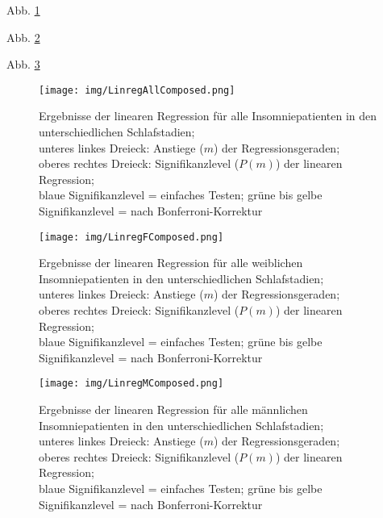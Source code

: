 Abb. \ref{fig:LinregAllComposed}

Abb. \ref{fig:LinregFComposed}

Abb. \ref{fig:LinregMComposed}




\begin{figure}[H]
	\centering
	\texttt{[image: img/LinregAllComposed.png]}
	\caption[Ergebnisse der linearen Regression für alle Insomniepatienten]{Ergebnisse der linearen Regression für alle Insomniepatienten in den unterschiedlichen Schlafstadien;\\unteres linkes Dreieck: Anstiege ($m$) der Regressionsgeraden;\\oberes rechtes Dreieck: Signifikanzlevel ($P(m)$) der linearen Regression;\\blaue Signifikanzlevel = einfaches Testen; grüne bis gelbe Signifikanzlevel = nach Bonferroni-Korrektur}
	\label{fig:LinregAllComposed}
\end{figure}




\begin{figure}[H]
	\centering
	\texttt{[image: img/LinregFComposed.png]}
	\caption[Ergebnisse der linearen Regression für alle weiblichen Insomniepatienten]{Ergebnisse der linearen Regression für alle weiblichen Insomniepatienten in den unterschiedlichen Schlafstadien;\\unteres linkes Dreieck: Anstiege ($m$) der Regressionsgeraden;\\oberes rechtes Dreieck: Signifikanzlevel ($P(m)$) der linearen Regression;\\blaue Signifikanzlevel = einfaches Testen; grüne bis gelbe Signifikanzlevel = nach Bonferroni-Korrektur}
	\label{fig:LinregFComposed}
\end{figure}




\begin{figure}[H]
	\centering
	\texttt{[image: img/LinregMComposed.png]}
	\caption[Ergebnisse der linearen Regression für alle männlichen Insomniepatienten]{Ergebnisse der linearen Regression für alle männlichen Insomniepatienten in den unterschiedlichen Schlafstadien;\\unteres linkes Dreieck: Anstiege ($m$) der Regressionsgeraden;\\oberes rechtes Dreieck: Signifikanzlevel ($P(m)$) der linearen Regression;\\blaue Signifikanzlevel = einfaches Testen; grüne bis gelbe Signifikanzlevel = nach Bonferroni-Korrektur}
	\label{fig:LinregMComposed}
\end{figure}




